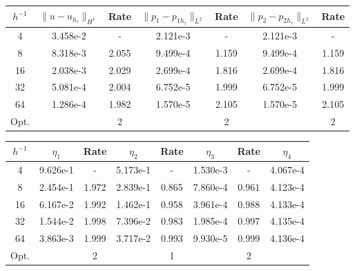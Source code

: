 \begin{center} 
\centering
\begin{tabular}{c|c|c|c|c|c|c}
$h^{-1}$ & $\|u - u_{h_{\tau}}\|_{H^1}$ & Rate & $\|p_1 - p_{1h_{\tau}}\|_{L^2}$ & Rate & $\|p_2 - p_{2h_{\tau}}\|_{L^2}$ & Rate\\\hline
4  & 3.458e-2 & -     & 2.121e-3 & -     & 2.121e-3 & -     \\
8  & 8.318e-3 & 2.055 & 9.499e-4 & 1.159 & 9.499e-4 & 1.159 \\
16 & 2.038e-3 & 2.029 & 2.699e-4 & 1.816 & 2.699e-4 & 1.816 \\
32 & 5.081e-4 & 2.004 & 6.752e-5 & 1.999 & 6.752e-5 & 1.999 \\
64 & 1.286e-4 & 1.982 & 1.570e-5 & 2.105 & 1.570e-5 & 2.105 \\\hline
Opt. & & 2 & & 2 & & 2
\end{tabular}
 \label{tab:bb_default_transfer_space_error}
\end{center}
\begin{center} 
\centering
\begin{tabular}{c|c|c|c|c|c|c|c}
$h^{-1}$ & $\eta_1$ & Rate &  $\eta_2$ & Rate & $\eta_3$ & Rate & $\eta_4$ \\\hline
4  & 9.626e-1 & -     & 5.173e-1 & -     & 1.530e-3 & -     & 4.067e-4 \\
8  & 2.454e-1 & 1.972 & 2.839e-1 & 0.865 & 7.860e-4 & 0.961 & 4.123e-4 \\
16 & 6.167e-2 & 1.992 & 1.462e-1 & 0.958 & 3.961e-4 & 0.988 & 4.133e-4 \\
32 & 1.544e-2 & 1.998 & 7.396e-2 & 0.983 & 1.985e-4 & 0.997 & 4.135e-4 \\
64 & 3.863e-3 & 1.999 & 3.717e-2 & 0.993 & 9.930e-5 & 0.999 & 4.136e-4 \\\hline
Opt. & & 2 & & 1  & & 2 & 
\end{tabular}
 \label{tab:bb_default_transfer_space_est}
\end{center}
